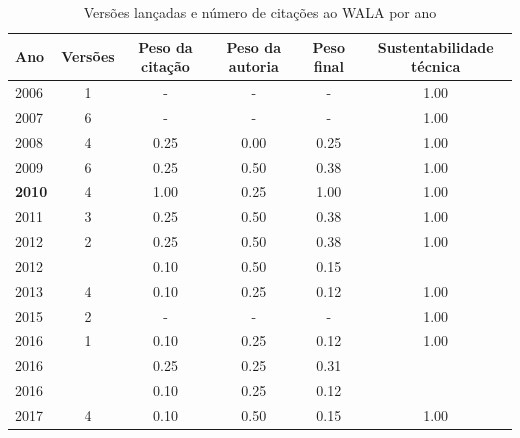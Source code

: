 \begin{table}[H]
\caption{Versões lançadas e número de citações ao WALA por ano}
\centering
\begin{tabular}{| l | c | c | c | c | c |}
  \hline
  Ano & Versões & Peso da citação & Peso da autoria & Peso final & Sustentabilidade técnica \\
  \hline
        2006 & 1 & - & - & -
        &
          {\color{blue} 1.00}
        \\
\hline
        2007 & 6 & - & - & -
        &
          {\color{blue} 1.00}
        \\
\hline
            2008
          &
          4
          &
          0.25
          &
          0.00
          &
          0.25
          &
            {\color{blue} 1.00}
          \\
\hline
            2009
          &
          6
          &
          0.25
          &
          0.50
          &
          0.38
          &
            {\color{blue} 1.00}
          \\
\hline
            {\bf 2010}
          &
          4
          &
          1.00
          &
          0.25
          &
          1.00
          &
            {\color{blue} 1.00}
          \\
\hline
            2011
          &
          3
          &
          0.25
          &
          0.50
          &
          0.38
          &
            {\color{blue} 1.00}
          \\
\hline
            2012
          &
          2
          &
          0.25
          &
          0.50
          &
          0.38
          &
            {\color{blue} 1.00}
          \\
            2012
          &
          
          &
          0.10
          &
          0.50
          &
          0.15
          &
          \\
\hline
            2013
          &
          4
          &
          0.10
          &
          0.25
          &
          0.12
          &
            {\color{blue} 1.00}
          \\
\hline
        2015 & 2 & - & - & -
        &
          {\color{blue} 1.00}
        \\
\hline
            2016
          &
          1
          &
          0.10
          &
          0.25
          &
          0.12
          &
            {\color{blue} 1.00}
          \\
            2016
          &
          
          &
          0.25
          &
          0.25
          &
          0.31
          &
          \\
            2016
          &
          
          &
          0.10
          &
          0.25
          &
          0.12
          &
          \\
\hline
            2017
          &
          4
          &
          0.10
          &
          0.50
          &
          0.15
          &
            {\color{blue} 1.00}
          \\
\hline
\end{tabular}
\end{table}

